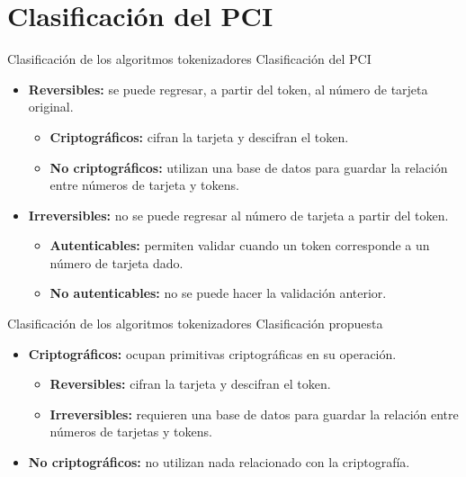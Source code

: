 %
%

\section{Clasificación del PCI}

\begin{frame}{Clasificación de los algoritmos tokenizadores}
  {Clasificación del PCI \cite{pci_tokens}}
  \begin{itemize}
    \item \textbf{Reversibles:} se puede regresar, a partir del token, al
      número de tarjeta original.
      \begin{itemize}
        \item \textbf{Criptográficos:} cifran la tarjeta y descifran el
          token.
        \item \textbf{No criptográficos:} utilizan una base de datos para
          guardar la relación entre números de tarjeta y tokens.
      \end{itemize}
    \item \textbf{Irreversibles:} no se puede regresar al número de tarjeta a
      partir del token.
      \begin{itemize}
        \item \textbf{Autenticables:} permiten validar cuando un token
          corresponde a un número de tarjeta dado.
        \item \textbf{No autenticables:} no se puede hacer la validación
          anterior.
      \end{itemize}
  \end{itemize}
\end{frame}

\begin{frame}{Clasificación de los algoritmos tokenizadores}
  {Clasificación propuesta}
  \begin{itemize}
    \item \textbf{Criptográficos:} ocupan primitivas criptográficas en su
      operación.
    \begin{itemize}
      \item \textbf{Reversibles:} cifran la tarjeta y descifran el
        token.
      \item \textbf{Irreversibles:} requieren una base de datos para
        guardar la relación entre números de tarjetas y tokens.
    \end{itemize}
    \item \textbf{No criptográficos:} no utilizan nada relacionado con la
        criptografía.
  \end{itemize}
\end{frame}

